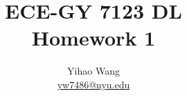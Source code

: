 \documentclass[en, 12pt, a4paper]{0elegantpaper}
\author{Yihao Wang \\ \href{mailto:yw7486@nyu.edu}{yw7486@nyu.edu}} %
\newcommand{\HWIndex}{1}
\begin{document}
\title{ECE-GY 7123 DL\\ Homework \HWIndex}
\maketitle


\end{document}
